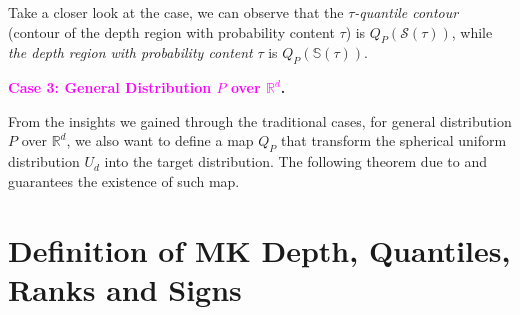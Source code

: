 \begin{remark}
	Take a closer look at the case, we can observe that the \textit{$\tau$-quantile contour} (contour of the depth region with probability content $\tau$) is $Q_P(\mathcal{S}(\tau))$, while \textit{the depth region with probability content} $\tau$ is $Q_P(\mathbb{S}(\tau))$.
\end{remark}

\noindent\textbf{\textcolor{magenta}{Case 3: General Distribution $P$ over $\mathbb{R}^d$}.}

From the insights we gained through the traditional cases, for general distribution $P$ over $\mathbb{R}^d$, we also want to define a map $Q_P$ that transform the spherical uniform distribution $U_d$ into the target distribution. The following theorem due to \cite{brenier1991polar} and \cite{mccann1995existence} guarantees the existence of such map.

\section{Definition of MK Depth, Quantiles, Ranks and Signs}
